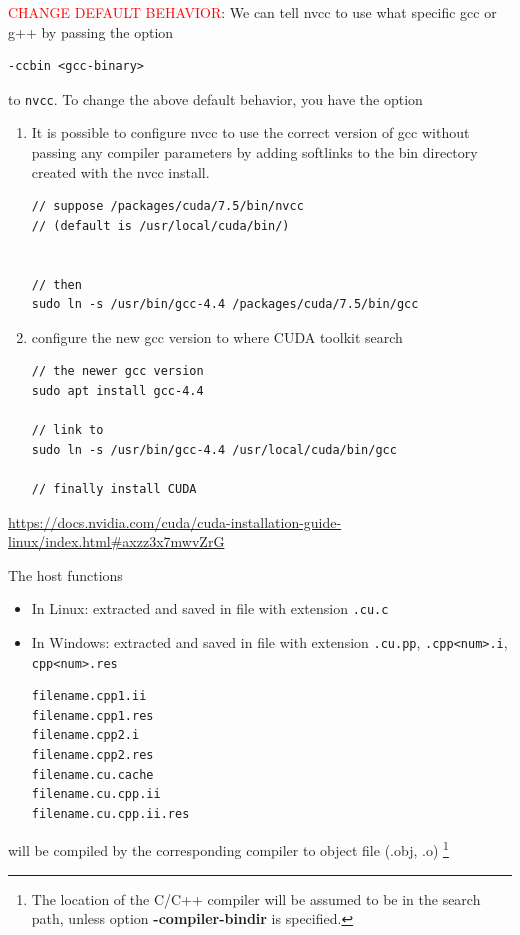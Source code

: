 \textcolor{red}{CHANGE DEFAULT BEHAVIOR}:
We can tell nvcc to use what specific gcc or g++ by passing the 
option 
\begin{verbatim}
-ccbin <gcc-binary>
\end{verbatim}
to \verb!nvcc!.
To change the above default behavior, you have the option
\begin{enumerate}
  
  \item  It is possible to configure nvcc to use the correct version of gcc
  without passing any compiler parameters by adding softlinks to the bin
  directory created with the nvcc install.
\begin{verbatim}
// suppose /packages/cuda/7.5/bin/nvcc
// (default is /usr/local/cuda/bin/)


// then 
sudo ln -s /usr/bin/gcc-4.4 /packages/cuda/7.5/bin/gcc

\end{verbatim}
  \item configure the new gcc version to where CUDA toolkit search
  
\begin{verbatim}
// the newer gcc version
sudo apt install gcc-4.4

// link to 
sudo ln -s /usr/bin/gcc-4.4 /usr/local/cuda/bin/gcc

// finally install CUDA
\end{verbatim}  
\end{enumerate}

\url{https://docs.nvidia.com/cuda/cuda-installation-guide-linux/index.html#axzz3x7mwvZrG}

The host functions 
\begin{itemize}
  \item In Linux: extracted and saved in file with extension \verb!.cu.c!  
  \item In Windows: extracted and saved in file with extension \verb!.cu.pp!, \verb!.cpp<num>.i!, \verb!cpp<num>.res!
\begin{verbatim}
filename.cpp1.ii
filename.cpp1.res
filename.cpp2.i
filename.cpp2.res
filename.cu.cache
filename.cu.cpp.ii
filename.cu.cpp.ii.res
\end{verbatim}  
\end{itemize}
will be compiled by the corresponding compiler to object file (.obj, .o)
\footnote{The location of the C/C++ compiler will be assumed to be in
  the search path, unless option {\bf -compiler-bindir} is specified.
}

